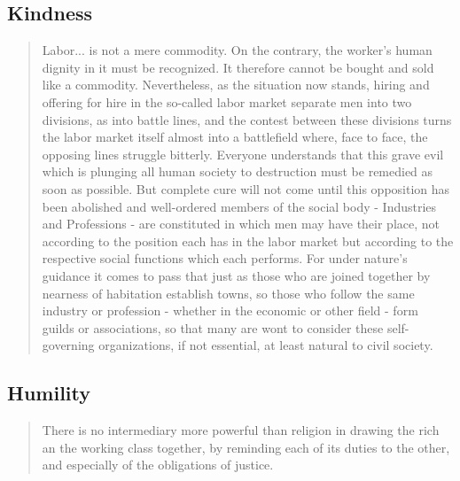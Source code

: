 \documentclass[letterpaper]{article}
\begin{document}
\hfill

\hfill

\subsection{Kindness}

\begin{quote}
  Labor... is not a mere commodity. On the contrary, the worker's human dignity in it must be recognized. It therefore cannot be bought and sold like a commodity. Nevertheless, as the situation now stands, hiring and offering for hire in the so-called labor market separate men into two divisions, as into battle lines, and the contest between these divisions turns the labor market itself almost into a battlefield where, face to face, the opposing lines struggle bitterly. Everyone understands that this grave evil which is plunging all human society to destruction must be remedied as soon as possible. But complete cure will not come until this opposition has been abolished and well-ordered members of the social body - Industries and Professions - are constituted in which men may have their place, not according to the position each has in the labor market but according to the respective social functions which each performs. For under nature's guidance it comes to pass that just as those who are joined together by nearness of habitation establish towns, so those who follow the same industry or profession - whether in the economic or other field - form guilds or associations, so that many are wont to consider these self-governing organizations, if not essential, at least natural to civil society.
\end{quote}

\hfill

\hfill

\hfill

\hfill

\hfill

\hfill

\hfill

\hfill


\subsection{Humility}

\begin{quote}
  There is no intermediary more powerful than religion in drawing the rich an the working class together, by reminding each of its duties to the other, and especially of the obligations of justice.
\end{quote}
\end{document}
